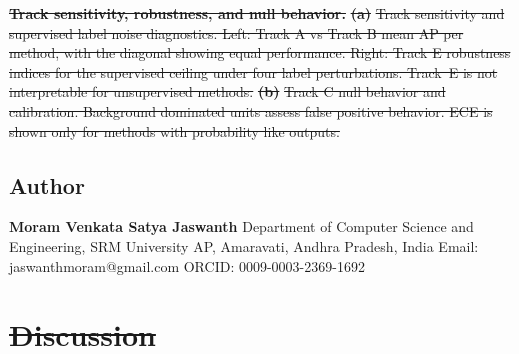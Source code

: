 \documentclass[10pt]{article}
\providecommand{\DIFaddtex}[1]{{\protect\color{trackgreen}#1}} %
\providecommand{\DIFdeltex}[1]{{\protect\color{red}\sout{#1}}}                      %
\providecommand{\DIFaddbegin}{} %
\providecommand{\DIFaddend}{} %
\providecommand{\DIFdelbegin}{} %
\providecommand{\DIFdelend}{} %
\providecommand{\DIFaddFL}[1]{\DIFadd{#1}} %
\providecommand{\DIFdelFL}[1]{\DIFdel{#1}} %
\providecommand{\DIFaddbeginFL}{} %
\providecommand{\DIFaddendFL}{} %
\providecommand{\DIFdelbeginFL}{} %
\providecommand{\DIFdelendFL}{} %
\providecommand{\DIFadd}[1]{\texorpdfstring{\DIFaddtex{#1}}{#1}} %
\providecommand{\DIFdel}[1]{\texorpdfstring{\DIFdeltex{#1}}{}} %
\newcommand{\DIFscaledelfig}{0.5}
\newlength{\DIFdelgraphicswidth} %
\newlength{\DIFdelgraphicsheight} %
\newcommand{\DIFaddincludegraphics}[2][]{{\color{trackgreen}\fbox{\DIFOincludegraphics[#1]{#2}}}} %
\newcommand{\DIFdelincludegraphics}[2][]{%
\sbox{\DIFdelgraphicsbox}{\DIFOincludegraphics[#1]{#2}}%
\settoboxwidth{\DIFdelgraphicswidth}{\DIFdelgraphicsbox} %
\settoboxtotalheight{\DIFdelgraphicsheight}{\DIFdelgraphicsbox} %
\scalebox{\DIFscaledelfig}{%
\parbox[b]{\DIFdelgraphicswidth}{\usebox{\DIFdelgraphicsbox}\\[-\baselineskip] \rule{\DIFdelgraphicswidth}{0em}}\llap{\resizebox{\DIFdelgraphicswidth}{\DIFdelgraphicsheight}{%
\setlength{\unitlength}{\DIFdelgraphicswidth}%
\begin{picture}(1,1)%
\thicklines\linethickness{2pt} %
{\color[rgb]{1,0,0}\put(0,0){\framebox(1,1){}}}%
{\color[rgb]{1,0,0}\put(0,0){\line( 1,1){1}}}%
{\color[rgb]{1,0,0}\put(0,1){\line(1,-1){1}}}%
\end{picture}%
}\hspace*{3pt}}} %
} %
\DeclareRobustCommand{\DIFaddbegin}{\DIFOaddbegin \let\includegraphics\DIFaddincludegraphics} %
\DeclareRobustCommand{\DIFaddend}{\DIFOaddend \let\includegraphics\DIFOincludegraphics} %
\DeclareRobustCommand{\DIFdelbegin}{\DIFOdelbegin \let\includegraphics\DIFdelincludegraphics} %
\DeclareRobustCommand{\DIFdelend}{\DIFOaddend \let\includegraphics\DIFOincludegraphics} %
\DeclareRobustCommand{\DIFaddbeginFL}{\DIFOaddbeginFL \let\includegraphics\DIFaddincludegraphics} %
\DeclareRobustCommand{\DIFaddendFL}{\DIFOaddendFL \let\includegraphics\DIFOincludegraphics} %
\DeclareRobustCommand{\DIFdelbeginFL}{\DIFOdelbeginFL \let\includegraphics\DIFdelincludegraphics} %
\DeclareRobustCommand{\DIFdelendFL}{\DIFOaddendFL \let\includegraphics\DIFOincludegraphics} %
\begin{document}
\DIFdelbegin %
\textbf{\DIFdelFL{Track sensitivity, robustness, and null behavior.}}%
\textbf{\DIFdelFL{(a)}} %
\DIFdelFL{Track sensitivity and supervised label noise diagnostics. Left: Track A vs Track B mean AP per method, with the diagonal showing equal performance. Right: Track E robustness indices for the supervised ceiling under four label perturbations. Track~E is not interpretable for unsupervised methods.}%
\textbf{\DIFdelFL{(b)}} %
\DIFdelFL{Track C null behavior and calibration. Background dominated units assess false positive behavior. ECE is shown only for methods with probability like outputs.}%
\DIFdelendFL \DIFaddbeginFL \subsection{\DIFaddFL{Author}}\label{author}
\DIFaddendFL 

\DIFdelbeginFL %
\DIFdelend \DIFaddbegin \textbf{\DIFadd{Moram Venkata Satya Jaswanth}} \DIFadd{Department of Computer Science and
Engineering, SRM University AP, Amaravati, Andhra Pradesh, India Email:
jaswanthmoram@gmail.com ORCID: 0009-0003-2369-1692
}\DIFaddend 

\DIFdelbegin \section{\DIFdel{Discussion}}
\addtocounter{section}{-1}%
\DIFdelend \DIFaddbegin \begin{center}\DIFadd{\rule{0.5\linewidth}{0.5pt}}\end{center}
\DIFaddend 
\end{document}
